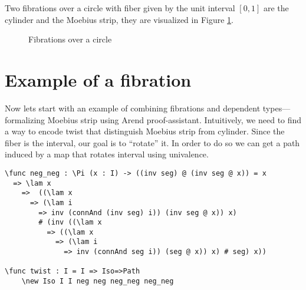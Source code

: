 Two fibrations over a circle with fiber given by the unit interval $[0,1]$ are the cylinder and the Moebius strip, they are visualized in Figure \ref{fig:1}.
\begin{figure}[H]
\centering
{}
\caption{Fibrations over a circle} \label{fig:1}
\end{figure}

\section{Example of a fibration}

Now lets start with an example of combining fibrations and dependent types---formalizing Moebius strip using Arend proof-assistant.
Intuitively, we need to find a way to encode twist that distinguish Moebius strip from cylinder. Since the fiber is the interval, our goal is to ``rotate'' it. In order to do so we can get a path induced by a map that rotates interval using univalence.  
\begin{ListingEnv}[H]
\begin{lstlisting}
\func neg_neg : \Pi (x : I) -> ((inv seg) @ (inv seg @ x)) = x 
  => \lam x 
    =>  ((\lam x 
      => (\lam i 
        => inv (connAnd (inv seg) i)) (inv seg @ x)) x)
        # (inv ((\lam x 
          => ((\lam x 
            => (\lam i 
              => inv (connAnd seg i)) (seg @ x)) x) # seg) x))

\func twist : I = I => Iso=>Path
    \new Iso I I neg neg neg_neg neg_neg
\end{lstlisting}
\end{ListingEnv}

